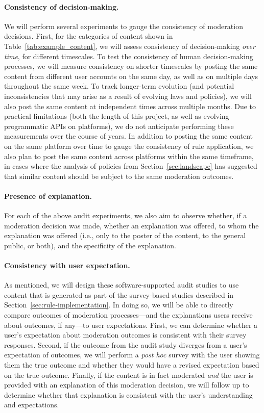\paragraph{Consistency of decision-making.} We will perform several
experiments to gauge the consistency of moderation decisions. First, for the
categories of content shown in Table~\ref{tab:example_content}, we will assess
consistency of decision-making {\em over time}, for different timescales. To
test the consistency of human decision-making processes, we will measure
consistency on shorter timescales by posting the same content from different
user accounts on the same day, as well as on multiple days throughout the same
week. To track longer-term evolution (and potential inconsistencies that may
arise as a result of evolving laws and policies), we will also post the same
content at independent times across multiple months. Due to practical
limitations (both the length of this project, as well as evolving programmatic
APIs on platforms), we do not anticipate performing these measurements over
the course of years. In addition to posting the same content on the same
platform over time to gauge the consistency of rule application, we also plan
to post the same content across platforms within the same timeframe, in cases where
the analysis of policies from Section~\ref{sec:landscape} has suggested that
similar content should be subject to the same moderation outcomes.

\paragraph{Presence of explanation.} For each of the above audit experiments,
we also aim to observe whether, if a moderation decision was made, whether an
explanation was offered, to whom the explanation was offered (i.e., only to
the poster of the content, to the general public, or both), and the specificity
of the explanation. 

\paragraph{Consistency with user expectation.} As mentioned, we will design
these software-supported audit studies to use content that is generated as
part of the survey-based studies described in
Section~\ref{sec:rule-implementation}. In doing so, we will be able to
directly compare outcomes of moderation processes---and the explanations users
receive about outcomes, if any---to user expectations. First, we can determine
whether a user's expectation about moderation outcomes is consistent with
their survey responses. Second, if the outcome from the audit study diverges
from a user's expectation of outcomes, we will perform a {\em post hoc} survey
with the user showing them the true outcome and whether they would have a
revised expectation based on the true outcome. Finally, if the content is in
fact moderated {\em and} the user is provided with an explanation of this
moderation decision, we will follow up to determine whether that explanation is consistent
with the user's understanding and expectations.


